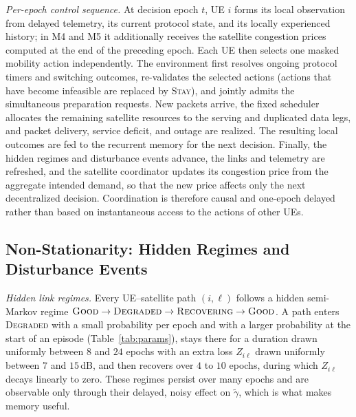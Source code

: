 \documentclass[journal]{IEEEtran}
\begin{document}
\emph{Per-epoch control sequence.}
At decision epoch $t$, UE $i$ forms its local observation from delayed
telemetry, its current protocol state, and its locally experienced history;
in M4 and M5 it additionally receives the satellite congestion prices
computed at the end of the preceding epoch. Each UE then selects one masked
mobility action independently. The environment first resolves ongoing
protocol timers and switching outcomes, re-validates the selected actions
(actions that have become infeasible are replaced by \textsc{Stay}), and
jointly admits the simultaneous preparation requests. New packets arrive,
the fixed scheduler allocates the remaining satellite resources to the
serving and duplicated data legs, and packet delivery, service deficit, and
outage are realized. The resulting local outcomes are fed to the recurrent
memory for the next decision. Finally, the hidden regimes and disturbance
events advance, the links and telemetry are refreshed, and the satellite
coordinator updates its congestion price from the aggregate intended demand,
so that the new price affects only the next decentralized decision.
Coordination is therefore causal and one-epoch delayed rather than based on
instantaneous access to the actions of other UEs.

\subsection{Non-Stationarity: Hidden Regimes and Disturbance Events}
\label{sec:nonstat}

\emph{Hidden link regimes.} Every UE--satellite path $(i,\ell)$ follows a
hidden semi-Markov regime $\textsc{Good}\to\textsc{Degraded}\to\textsc{Recovering}\to\textsc{Good}$.
A path enters \textsc{Degraded} with a small probability per epoch and with a
larger probability at the start of an episode (Table~\ref{tab:params}), stays
there for a duration drawn uniformly between $8$ and $24$ epochs with an extra
loss $Z_{i\ell}$ drawn uniformly between $7$ and $15$\,dB, and then recovers
over $4$ to $10$ epochs, during which $Z_{i\ell}$ decays linearly to zero.
These regimes persist over many epochs and are observable only through their
delayed, noisy effect on $\tilde\gamma$, which is what makes memory useful.
\end{document}

